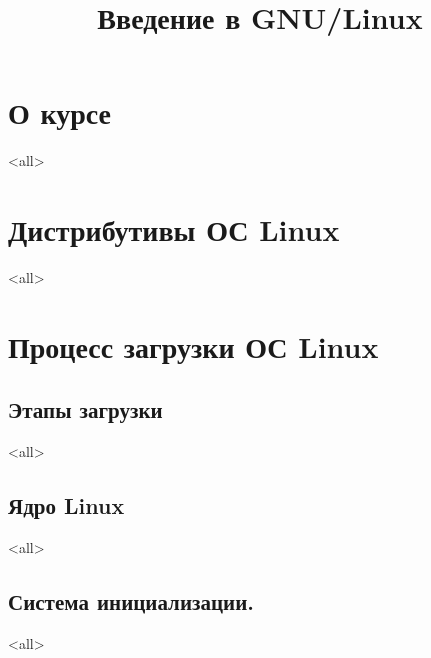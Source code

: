 

\title{Введение в GNU/Linux}





\begin{frame}
	\frametitle{}
	\titlepage
	\vspace{-0.5cm}
	\begin{center}
	\end{center}
\end{frame}


\begin{frame}
	\tableofcontents
	[hideallsubsections]
\end{frame}

\section{О курсе}

\mode<all>{}



\section{Дистрибутивы ОС Linux}
\mode<all>{}

\section{Процесс загрузки ОС Linux}
\subsection{Этапы загрузки}
\mode<all>{}

\subsection{Ядро Linux}
\mode<all>{}

\subsection{Система инициализации.}
\mode<all>{}

